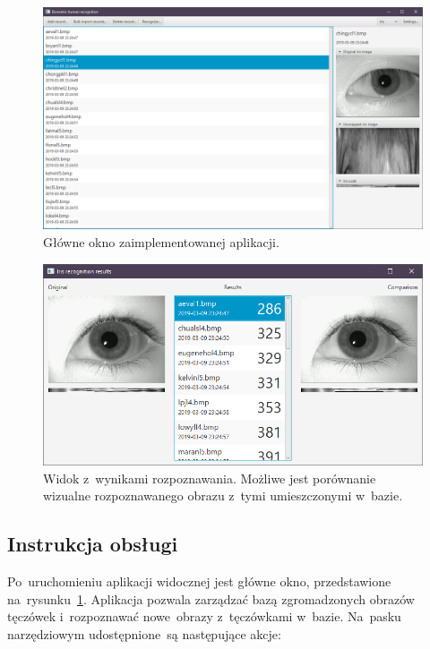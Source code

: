 \documentclass[11pt,a4paper]{article}
\begin{document}
\begin{figure}
    \centering
    \includegraphics[width=\textwidth]{res/img/main-window.PNG}
    \caption{Główne okno zaimplementowanej aplikacji.}
    \label{fig:main-window}
\end{figure}

\begin{figure}
    \centering
    \includegraphics[width=\textwidth]{res/img/recognition-results.PNG}
    \caption{Widok z~wynikami rozpoznawania.
    Możliwe jest porównanie wizualne rozpoznawanego obrazu z~tymi umieszczonymi w~bazie.}
    \label{fig:recognition-results}
\end{figure}

\subsection{Instrukcja obsługi}

Po~uruchomieniu aplikacji widocznej jest główne okno, przedstawione na~rysunku~\ref{fig:main-window}.
Aplikacja pozwala zarządzać bazą zgromadzonych obrazów tęczówek i~rozpoznawać nowe~obrazy z~tęczówkami w~bazie.
Na~pasku narzędziowym udostępnione~są następujące akcje:
\end{document}
